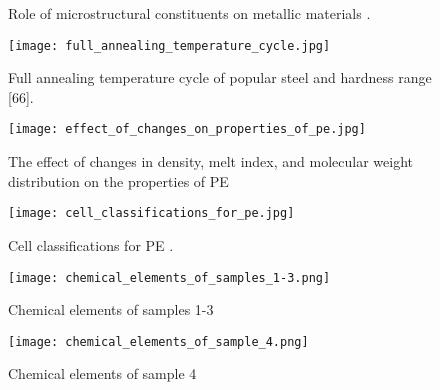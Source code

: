 \begin{figure}[H]
\caption{Role of microstructural constituents on metallic materials \cite{suryanarayana2017microstructure}.}
\label{appendix:role}
\end{figure}

\begin{figure}[H]
    \texttt{[image: full\_annealing\_temperature\_cycle.jpg]}
    \caption{Full annealing temperature cycle of popular steel and hardness range [66].}
    \label{appendix:range}
\end{figure}

\begin{figure}[H]
    \texttt{[image: effect\_of\_changes\_on\_properties\_of\_pe.jpg]}
    \caption{The effect of changes in density, melt index, and molecular weight distribution on the properties of PE \cite{gabriel1998history}}
\end{figure}

\begin{figure}[H]
    \texttt{[image: cell\_classifications\_for\_pe.jpg]}
    \caption{Cell classifications for PE \cite{peacock2000handbook}.}
    \label{appendix:classifications}
\end{figure}

\begin{figure}[H]
    \texttt{[image: chemical\_elements\_of\_samples\_1-3.png]}
    \caption{Chemical elements of samples 1-3}
    \label{appendix:samples_1-3}
\end{figure}

\begin{figure}[H]
    \texttt{[image: chemical\_elements\_of\_sample\_4.png]}
    \caption{Chemical elements of sample 4}
    \label{appendix:sample4}
\end{figure}